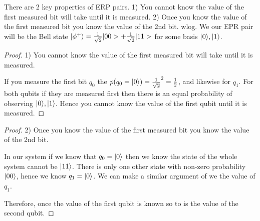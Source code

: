 There are 2 key properties of ERP pairs.
1) You cannot know the value of the first measured bit will take until it is measured.
2) Once you know the value of the first measured bit you know the value of the 2nd bit.
wlog. We our EPR pair will be the Bell state $\lvert\phi^+\rangle= \frac{1}{\sqrt{2}}|00> + \frac{1}{\sqrt{2}}|11> $ for some basis $\lvert0\rangle, \lvert1\rangle$.

\begin{proof} 1) You cannot know the value of the first measured bit will take until it is measured.

    If you measure the first bit $q_0$ the $p(q_0=\lvert0\rangle) = \frac{1}{\sqrt{2}}^2 = \frac{1}{2}$, and likewise for $q_1$.
    For both qubits if they are measured first then there is an equal probability of observing $\lvert0\rangle, \lvert1\rangle$.
    Hence you cannot know the value of the first qubit until it is measured.
\end{proof}

\begin{proof} 2) Once you know the value of the first measured bit you know the value of the 2nd bit.

In our system if we know that $q_0=\lvert0\rangle$ then we know the state of the whole system cannot be $\lvert11\rangle$.
There is only one other state with non-zero probability $\lvert00\rangle$, hence we know $q_1=\lvert0\rangle$.
We can make a similar argument of we the value of $q_1$.

Therefore, once the value of the first qubit is known so to is the value of the second qubit.
\end{proof}




